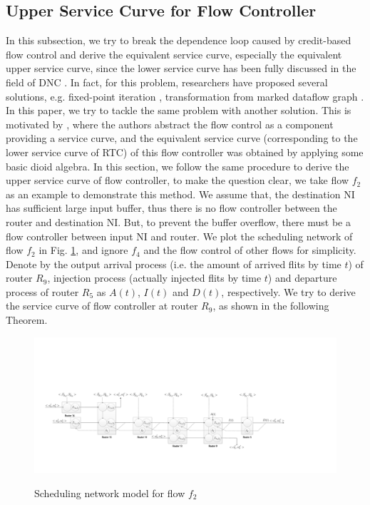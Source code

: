 \documentclass[10pt,journal]{IEEEtran}
\begin{document}
\subsection{Upper Service Curve for Flow Controller}\label{flowcontrol}
In this subsection, we try to break the dependence loop caused by credit-based flow control and derive the equivalent service curve, especially the equivalent upper service curve, since the lower service curve has been fully discussed in the field of DNC \cite{Boudec2001Network}. In fact, for this problem, researchers have proposed several solutions, e.g. fixed-point iteration \cite{schioler2005network}\cite{Jonsson:2008:CDM:1450058.1450083}, transformation from marked dataflow graph \cite{Thiele:2009:MPA:1629335.1629353}. In this paper, we try to tackle the same problem with another solution. This is motivated by \cite{QLDD09FC}, where the authors abstract the flow control as a component providing a service curve, and the equivalent service curve (corresponding to the lower service curve of RTC) of this flow controller was obtained by applying some basic dioid algebra. In this section, we follow the same procedure to derive the upper service curve of flow controller, to make the question clear, we take flow $f_2$ as an example to demonstrate this method. We assume that, the destination NI has sufficient large input buffer, thus there is no flow controller between the router and destination NI. But, to prevent the buffer overflow, there must be a flow controller between input NI and router. We plot the scheduling network of flow $f_2$ in Fig. \ref{f2}, and ignore $f_4$ and the flow control of other flows for simplicity. Denote by the output arrival process (i.e. the amount of arrived flits by time $t$) of router $R_9$, injection process (actually injected flits by time $t$) and departure process of router $R_{5}$ as $A(t)$, $I(t)$ and $D(t)$, respectively. We try to derive the service curve of flow controller at router $R_9$, as shown in the following Theorem.
\begin{figure}
  \centering
  \includegraphics[scale=0.35]{figures/f2.pdf}\\
  \caption{Scheduling network model for flow $f_2$}\label{f2}
\end{figure}
\end{document}
